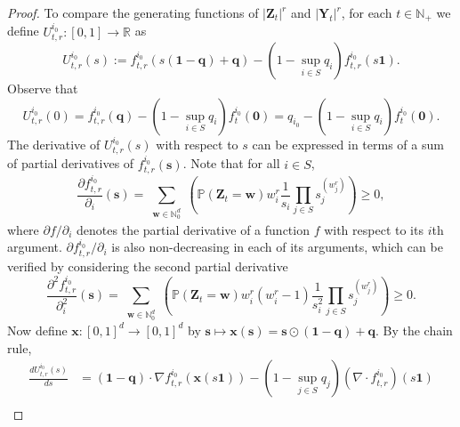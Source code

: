 \documentclass[preprint,3p,12pt]{elsarticle}
\theoremstyle{definition}
\begin{document}
\begin{proof}
  To compare the generating functions of $|\boldsymbol{Z}_t|^r$ and $|\boldsymbol{Y}_t|^r$, for each $t \in \mathbb{N}_+$ we define $U_{t,r}^{i_0}:[0,1]\to\mathbb{R}$ as %
\begin{equation*}
    U^{i_0}_{t, r}(s) := f_{t, r}^{i_0}( s(\boldsymbol{1}-\boldsymbol{q}) +\boldsymbol{q}) - (1-\sup_{i \in S}q_i)f_{t,r}^{i_0}(s\boldsymbol{1}).
\end{equation*}
Observe that 
\begin{equation*}
    U^{i_0}_{t,r}(0) = f_{t,r}^{i_0}(\boldsymbol{q}) -(1-\sup_{i \in S}q_i) f_{t}^{i_0}(\boldsymbol{0}) = q_{i_0} - (1-\sup_{i \in S}q_i) f_{t}^{i_0}(\boldsymbol{0}).
\end{equation*}
The derivative of $U^{i_0}_{t,r}(s)$ with respect to $s$ can be expressed in terms of a sum of partial derivatives of $f_{t,r}^{i_0}(\boldsymbol{s})$. Note that for all $i \in S$,%
 \begin{equation*}
     \frac{\partial f_{t,r}^{i_0}}{\partial_i}(\boldsymbol{s})=\sum_{\substack{\boldsymbol{w} \in \mathbb{N}_0^d{}}}
     \left(\mathbb{P}(\boldsymbol{Z}_t=\boldsymbol{w}) w_i^r \frac{1}{s_i} \prod_{j \in S} s_j^{(w_j^r)}\right) \ge 0,
 \end{equation*} 
 where $\partial f/\partial_i$ denotes the partial derivative of a function $f$ with respect to its $i$th argument. ${\partial f_{t,r}^{i_0}}/{\partial_i}$ is also non-decreasing in each of its arguments, which can be verified by considering the second partial derivative
 \begin{equation*}
     \frac{\partial^2 f_{t,r}^{i_0}}{\partial_i^2}(\boldsymbol{s})=\sum_{\substack{\boldsymbol{w} \in \mathbb{N}_0^d{}}}
     \left(\mathbb{P}(\boldsymbol{Z}_t=\boldsymbol{w}) w_i^r (w_i^r - 1) \frac{1}{s_i^2} \prod_{j \in S} s_j^{(w_j^r)}\right) \ge 0.
 \end{equation*}
 Now define $\boldsymbol{x}:[0,1]^d\to[0,1]^d$ by $\boldsymbol{s} \mapsto \boldsymbol{x}(\boldsymbol{s}) = \boldsymbol{s} \odot (\boldsymbol{1}-\boldsymbol{q}) + \boldsymbol{q}$. By the chain rule, 
\begin{align}
 \frac{dU_{t,r}^{i_0}(s)}{ds} &= (\boldsymbol{1} - \boldsymbol{q}) \cdot \nabla f_{t,r}^{i_0} (\boldsymbol{x}(s\boldsymbol{1})) - (1-\sup_{j \in S} q_j) (\nabla \cdot f_{t,r}^{i_0})(s\boldsymbol 1) \label{eq:sup_qi}\\

\end{align}
\end{proof}
\end{document}
